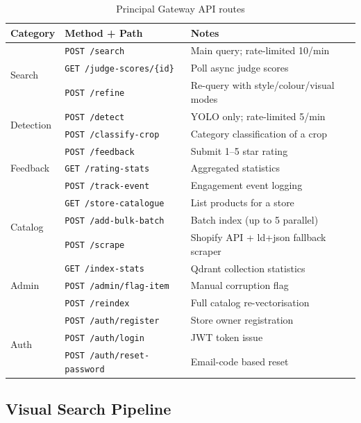 \documentclass[12pt]{article}
\begin{document}
\begin{table}[H]
\centering
\small
\begin{tabular}{@{}lll@{}}
\toprule
\textbf{Category} & \textbf{Method + Path} & \textbf{Notes} \\ \midrule
\multirow{3}{*}{Search} & \texttt{POST /search} & Main query; rate-limited 10/min \\
 & \texttt{GET  /judge-scores/\{id\}} & Poll async judge scores \\
 & \texttt{POST /refine} & Re-query with style/colour/visual modes \\ \midrule
\multirow{2}{*}{Detection} & \texttt{POST /detect} & YOLO only; rate-limited 5/min \\
 & \texttt{POST /classify-crop} & Category classification of a crop \\ \midrule
\multirow{3}{*}{Feedback} & \texttt{POST /feedback} & Submit 1--5 star rating \\
 & \texttt{GET  /rating-stats} & Aggregated statistics \\
 & \texttt{POST /track-event} & Engagement event logging \\ \midrule
\multirow{3}{*}{Catalog} & \texttt{GET  /store-catalogue} & List products for a store \\
 & \texttt{POST /add-bulk-batch} & Batch index (up to 5 parallel) \\
 & \texttt{POST /scrape} & Shopify API + ld+json fallback scraper \\ \midrule
\multirow{3}{*}{Admin} & \texttt{GET  /index-stats} & Qdrant collection statistics \\
 & \texttt{POST /admin/flag-item} & Manual corruption flag \\
 & \texttt{POST /reindex} & Full catalog re-vectorisation \\ \midrule
\multirow{3}{*}{Auth} & \texttt{POST /auth/register} & Store owner registration \\
 & \texttt{POST /auth/login} & JWT token issue \\
 & \texttt{POST /auth/reset-password} & Email-code based reset \\ \bottomrule
\end{tabular}
\caption{Principal Gateway API routes}
\label{tab:gw-routes}
\end{table}

\subsection{Visual Search Pipeline}
\end{document}

